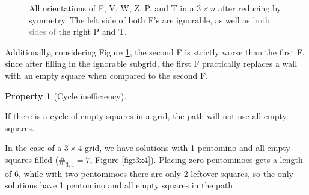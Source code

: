 \documentclass{article}
\theoremstyle{definition}%
\newtheorem{property}[theorem]{Property}
\newcommand{\minordetail}[1]{\textcolor{gray}{#1}}
\begin{document}
\begin{figure}[htbp]
    \caption{All orientations of F, V, W, Z, P, and T in a $3 \times n$ after reducing by symmetry. The left side of both F's are ignorable, as well as \minordetail{both sides of} the right P and T.}
    \label{fig:Reduced orientations}
\end{figure}

Additionally, considering Figure \ref{fig:Reduced orientations}, the second F is strictly worse than the first F, since after filling in the ignorable subgrid, the first F practically replaces a wall with an empty square when compared to the second F.

\begin{property}[Cycle inefficiency]
\label{prop:cycineff}

If there is a cycle of empty squares in a grid, the path will not use all empty squares.
\end{property}

In the case of a $3 \times 4$ grid, we have solutions with 1 pentomino and all empty squares filled ($\#_{3, 4} = 7$, Figure \ref{fig:3x4}). Placing zero pentominoes gets a length of 6, while with two pentominoes there are only 2 leftover squares, so the only solutions have 1 pentomino and all empty squares in the path.
\end{document}

